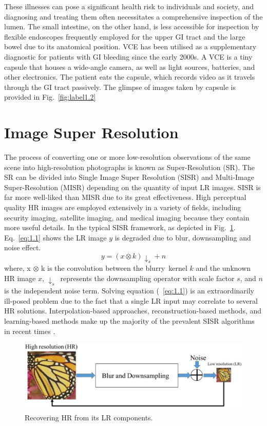 These illnesses can pose a significant health risk to individuals and society, and diagnosing and treating them often necessitates a comprehensive inspection of the lumen. The small intestine, on the other hand, is less accessible for inspection by flexible endoscopes frequently employed for the upper GI tract and the large bowel due to its anatomical position. VCE has been utilised as a supplementary diagnostic for patients with GI bleeding since the early 2000s. A VCE is a tiny capsule that houses a wide-angle camera, as well as light sources, batteries, and other electronics. The patient eats the capsule, which records video as it travels through the GI tract passively. The glimpse of images taken by capsule is provided in Fig.~\ref{fig:label1.2}
\section{Image Super Resolution}
The process of converting one or more low-resolution observations of the same scene into high-resolution photographs is known as Super-Resolution (SR). The SR can be divided into Single Image Super Resolution (SISR) and Multi-Image Super-Resolution (MISR) depending on the quantity of input LR images. SISR is far more well-liked than MISR due to its great effectiveness. High perceptual quality HR images are employed extensively in a variety of fields, including security imaging, satellite imaging, and medical imaging because they contain more useful details. In the typical SISR framework, as depicted in Fig.~\ref{fig:label1.3}. Eq.~\ref{eq:1.1} shows the LR image $y$ is degraded due to blur, downsampling and noise effect.  
\begin{equation} \label{eq:1.1}
y=(x \otimes k) \downarrow_{s}+n
\end{equation}
where, x $\otimes{}$ k is the convolution between the blurry kernel $k$ and the unknown HR image $x$, $\downarrow_{s}$ represents the downsampling operator with scale factor $s$, and $n$ is the independent noise term. Solving equation (~\ref{eq:1.1}) is an extraordinarily ill-posed problem due to the fact that a single LR input may correlate to several HR solutions. Interpolation-based approaches, reconstruction-based methods, and learning-based methods make up the majority of the prevalent SISR algorithms in recent times \cite{DLSR}.
\begin{figure}[h]
    \centering
    \includegraphics[totalheight=1.5in]{Chapter1/Fig6.jpg}
    \caption[Recovering HR from its LR components]{Recovering HR from its LR components.\cite{DLSR}}
    \label{fig:label1.3}
\end{figure}
